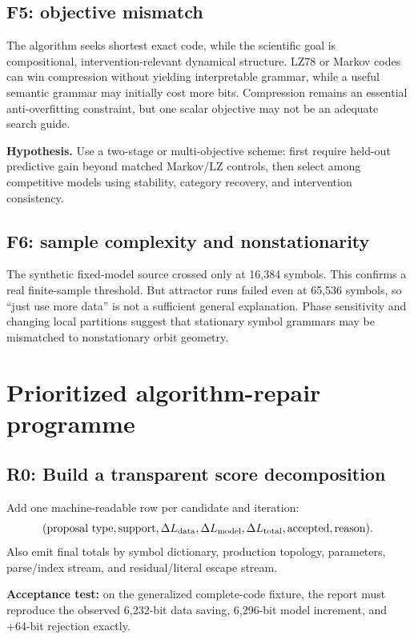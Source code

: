 \documentclass[10pt]{article}
\newcommand{\hyp}{\textbf{Hypothesis.}}
\begin{document}
\subsection{F5: objective mismatch}

The algorithm seeks shortest exact code, while the scientific goal is
compositional, intervention-relevant dynamical structure. LZ78 or Markov codes
can win compression without yielding interpretable grammar, while a useful
semantic grammar may initially cost more bits. Compression remains an
essential anti-overfitting constraint, but one scalar objective may not be an
adequate search guide.

\hyp{} Use a two-stage or multi-objective scheme: first require held-out
predictive gain beyond matched Markov/LZ controls, then select among competitive
models using stability, category recovery, and intervention consistency.

\subsection{F6: sample complexity and nonstationarity}

The synthetic fixed-model source crossed only at 16,384 symbols. This confirms
a real finite-sample threshold. But attractor runs failed even at 65,536
symbols, so ``just use more data'' is not a sufficient general explanation.
Phase sensitivity and changing local partitions suggest that stationary
symbol grammars may be mismatched to nonstationary orbit geometry.

\section{Prioritized algorithm-repair programme}

\subsection*{R0: Build a transparent score decomposition}

Add one machine-readable row per candidate and iteration:
\[
(\text{proposal type},\text{support},\Delta L_{\rm data},
\Delta L_{\rm model},\Delta L_{\rm total},\text{accepted},\text{reason}).
\]
Also emit final totals by symbol dictionary, production topology, parameters,
parse/index stream, and residual/literal escape stream.

\textbf{Acceptance test:} on the generalized complete-code fixture, the report
must reproduce the observed 6,232-bit data saving, 6,296-bit model increment,
and +64-bit rejection exactly.
\end{document}
